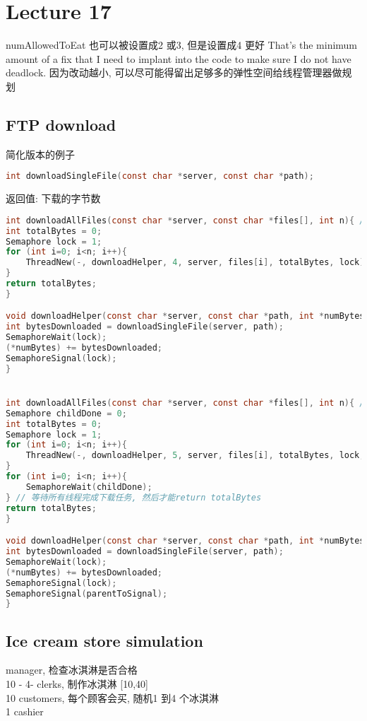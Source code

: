 \documentclass{article}
\begin{document}
\section{Lecture 17}
numAllowedToEat 也可以被设置成2 或3, 但是设置成4 更好
That's the minimum amount of a fix that I need to implant into the code to make sure I do not have deadlock.
因为改动越小, 可以尽可能得留出足够多的弹性空间给线程管理器做规划

\subsection{FTP download}
简化版本的例子
\begin{lstlisting}[language = C]
int downloadSingleFile(const char *server, const char *path);
\end{lstlisting}
返回值: 下载的字节数

\begin{lstlisting}[language = C]
int downloadAllFiles(const char *server, const char *files[], int n){ // n files
int totalBytes = 0;
Semaphore lock = 1;
for (int i=0; i<n; i++){
	ThreadNew(-, downloadHelper, 4, server, files[i], totalBytes, lock);
}
return totalBytes;
}

void downloadHelper(const char *server, const char *path, int *numBytes, Semaphore lock){
int bytesDownloaded = downloadSingleFile(server, path);
SemaphoreWait(lock);
(*numBytes) += bytesDownloaded;
SemaphoreSignal(lock);
}


int downloadAllFiles(const char *server, const char *files[], int n){ // n files
Semaphore childDone = 0;
int totalBytes = 0;
Semaphore lock = 1;
for (int i=0; i<n; i++){
	ThreadNew(-, downloadHelper, 5, server, files[i], totalBytes, lock, childDone);
}
for (int i=0; i<n; i++){
	SemaphoreWait(childDone);
} // 等待所有线程完成下载任务, 然后才能return totalBytes
return totalBytes;
}

void downloadHelper(const char *server, const char *path, int *numBytes, Semaphore lock, Semaphore parentToSignal){
int bytesDownloaded = downloadSingleFile(server, path);
SemaphoreWait(lock);
(*numBytes) += bytesDownloaded;
SemaphoreSignal(lock);
SemaphoreSignal(parentToSignal);
}
\end{lstlisting}

\subsection{Ice cream store simulation}
manager, 检查冰淇淋是否合格\\
10 - 4- clerks, 制作冰淇淋  [10,40]\\
10 customers, 每个顾客会买, 随机1 到4 个冰淇淋\\
1 cashier
\end{document}
